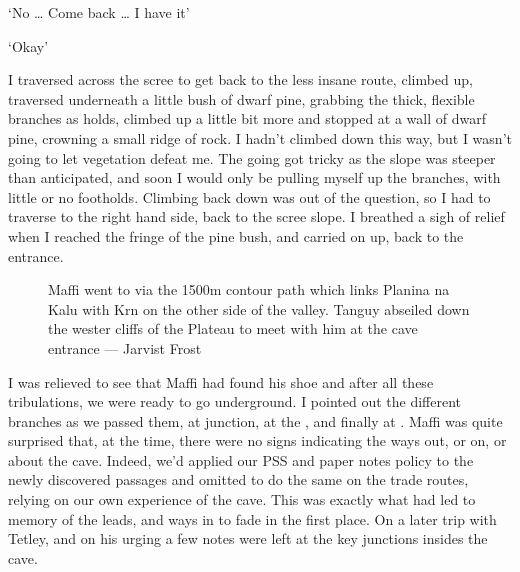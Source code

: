 ‘No … Come back … I have it’

‘Okay’

I traversed across the scree to get back to the less insane route, climbed up, traversed underneath a little bush of dwarf pine, grabbing the thick, flexible branches as holds, climbed up a little bit more and stopped at a wall of dwarf pine, crowning a small ridge of rock. I hadn’t climbed down this way, but I wasn’t going to let vegetation defeat me. The going got tricky as the slope was steeper than anticipated, and soon I would only be pulling myself up the branches, with little or no footholds. Climbing back down was out of the question, so I had to traverse to the right  hand side, back to the scree slope. I breathed a sigh of relief when I reached the fringe of the pine bush, and carried on up, back to the entrance. 

\begin{figure}[t!]
\checkoddpage \ifoddpage \forcerectofloat \else \forceversofloat \fi
\centering
{}
\caption{Maffi went to  via the 1500m contour path which links Planina na Kalu with Krn on the other side of the valley. Tanguy abseiled down the wester cliffs of the Plateau to meet with him at the cave entrance --- Jarvist Frost}
\label{forest}
\end{figure}

I was relieved to see that Maffi had found his shoe and after all these tribulations, we were ready to go underground. I pointed out the different branches as we passed them, at  junction, at the , and finally at . Maffi was quite surprised that, at the time, there were no signs indicating the ways out, or on, or about the cave. Indeed, we’d applied our PSS and paper notes policy to the newly discovered passages and omitted to do the same on the trade routes, relying on our own experience of the cave. This was exactly what had led to memory of the leads, and ways in  to fade in the first place. On a later trip with Tetley, and on his urging a few notes were left at the key junctions insides the cave.

